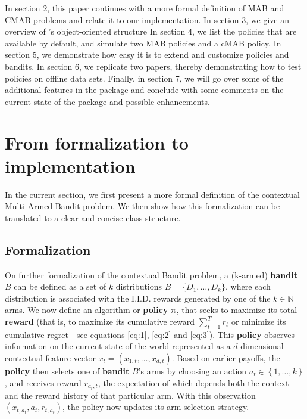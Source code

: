 \documentclass{jss}\usepackage[]{graphicx}\usepackage[]{color}
\begin{document}
In section 2, this paper continues with a more formal definition of MAB and CMAB problems and relate it to our implementation. In section 3, we give an overview of ’s object-oriented structure In section 4, we list the policies that are available by default, and simulate two MAB policies and a cMAB policy. In section 5, we demonstrate how easy it is to extend and customize  policies and bandits. In section 6, we replicate two papers, thereby demonstrating how to test policies on offline data sets. Finally, in section  7, we will go over some of the additional features in the package and conclude with some comments on the current state of the package and possible enhancements.

\section{From formalization to implementation}


In the current section, we first present a more formal definition of the contextual Multi-Armed Bandit problem. We then show how this formalization can be translated to a clear and concise class structure.

\subsection{Formalization}

On further formalization of the contextual Bandit problem, a (k-armed) \textbf{bandit} $B$ can be defined as a set of $k$ distributions $B=\{D_{1},\dots ,D_{k}\}$, where each distribution is associated with the I.I.D. rewards generated by one of the $k\in \mathbb {N} ^{+}$ arms. We now define an algorithm or \textbf{policy} $\piup$, that seeks to maximize its total \textbf{reward} (that is, to maximize its cumulative reward $\sum_{t=1}^T r_t$ or minimize its cumulative regret---see equations \ref{eq:1}, \ref{eq:2} and \ref{eq:3}). This \textbf{policy} observes information on the current state of the world represented as a $d$-dimensional contextual feature vector \(x_{t}=\left( x_{1,t},  \dots, x_{d,t}\right)\). Based on earlier payoffs, the \textbf{policy} then selects one of \textbf{bandit} $B$'s arms by choosing an action \(a_{t} \in \left\{ 1, \dots, k \right\}\), and receives reward \(r_{a_{t},t}\), the expectation of which depends both the context and the reward history of that particular arm. With this observation \( (x_{t,a_t},a_{t},r_{t,a_t}) \), the policy now updates its arm-selection strategy.
\end{document}
